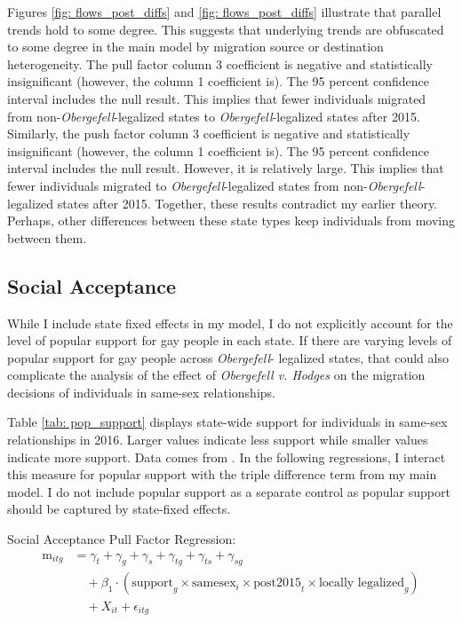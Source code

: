 \documentclass[12pt,letterpaper]{article}
\begin{document}
Figures \ref{fig: flows_post_diffs} and \ref{fig: flows_post_diffs} illustrate that parallel trends hold to some degree. This suggests that underlying trends are obfuscated to some degree in the main model by migration source or destination heterogeneity. The pull factor column 3 coefficient is negative and statistically insignificant (however, the column 1 coefficient is). The 95 percent confidence interval includes the null result. This implies that fewer individuals migrated from non-\textit{Obergefell}-legalized states to \textit{Obergefell}-legalized states after 2015.  Similarly, the push factor column 3 coefficient is negative and statistically insignificant (however, the column 1 coefficient is). The 95 percent confidence interval includes the null result. However, it is relatively large. This implies that fewer individuals migrated to \textit{Obergefell}-legalized states from non-\textit{Obergefell}-legalized states after 2015. Together, these results contradict my earlier theory. Perhaps, other differences between these state types keep individuals from moving between them.


\FloatBarrier
\subsection{Social Acceptance}

While I include state fixed effects in my model, I do not explicitly account for the level of popular support for gay people in each state. If there are varying levels of popular support for gay people across \textit{Obergefell}- legalized states, that could also complicate the analysis of the effect of \textit{Obergefell v. Hodges} on the migration decisions of individuals in same-sex relationships.



Table \ref{tab: pop_support} displays state-wide support for individuals in same-sex relationships in 2016. Larger values indicate less support while smaller values indicate more support. Data comes from \citet{29}. In the following regressions, I interact this measure for popular support with the triple difference term from my main model. I do not include popular support as a separate control as popular support should be captured by state-fixed effects.

\hfill
\break
Social Acceptance Pull Factor Regression:
\begin{equation}
\begin{aligned}
\text{m}_{itg} &= \gamma_t + \gamma_g + \gamma_s + \gamma_{tg} + \gamma_{ts} + \gamma_{sg} \\
&\quad + \beta_1 \cdot (\text{support}_g \times \text{samesex}_i \times \text{post2015}_t \times \text{locally legalized}_g) \\
&\quad + X_{it} + \epsilon_{itg}
\end{aligned}
\end{equation}
\end{document}

